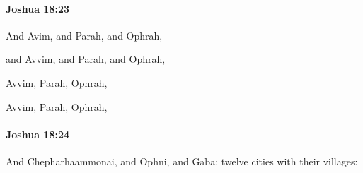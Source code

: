 		\paragraph{Joshua 18:23} %
			\label{JOSHUA-18-23}

			And Avim, and Parah, and Ophrah,

			\begin{versebox}
					\item[BHS] 
					\item[ASV] and Avvim, and Parah, and Ophrah,
					\item[NIV] Avvim, Parah, Ophrah,
					\item[NRSV] Avvim, Parah, Ophrah,
			\end{versebox}

		\paragraph{Joshua 18:24} %
			\label{JOSHUA-18-24}

			And Chepharhaammonai, and Ophni, and Gaba; twelve cities with their villages:

